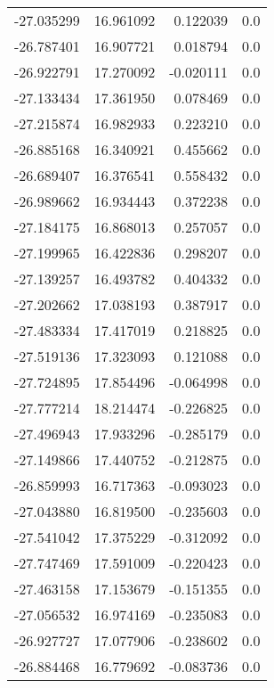 \begin{tabular}{rrrr}
      -27.035299 &        16.961092 &    0.122039 &   0.0 \\
      -26.787401 &        16.907721 &    0.018794 &   0.0 \\
      -26.922791 &        17.270092 &   -0.020111 &   0.0 \\
      -27.133434 &        17.361950 &    0.078469 &   0.0 \\
      -27.215874 &        16.982933 &    0.223210 &   0.0 \\
      -26.885168 &        16.340921 &    0.455662 &   0.0 \\
      -26.689407 &        16.376541 &    0.558432 &   0.0 \\
      -26.989662 &        16.934443 &    0.372238 &   0.0 \\
      -27.184175 &        16.868013 &    0.257057 &   0.0 \\
      -27.199965 &        16.422836 &    0.298207 &   0.0 \\
      -27.139257 &        16.493782 &    0.404332 &   0.0 \\
      -27.202662 &        17.038193 &    0.387917 &   0.0 \\
      -27.483334 &        17.417019 &    0.218825 &   0.0 \\
      -27.519136 &        17.323093 &    0.121088 &   0.0 \\
      -27.724895 &        17.854496 &   -0.064998 &   0.0 \\
      -27.777214 &        18.214474 &   -0.226825 &   0.0 \\
      -27.496943 &        17.933296 &   -0.285179 &   0.0 \\
      -27.149866 &        17.440752 &   -0.212875 &   0.0 \\
      -26.859993 &        16.717363 &   -0.093023 &   0.0 \\
      -27.043880 &        16.819500 &   -0.235603 &   0.0 \\
      -27.541042 &        17.375229 &   -0.312092 &   0.0 \\
      -27.747469 &        17.591009 &   -0.220423 &   0.0 \\
      -27.463158 &        17.153679 &   -0.151355 &   0.0 \\
      -27.056532 &        16.974169 &   -0.235083 &   0.0 \\
      -26.927727 &        17.077906 &   -0.238602 &   0.0 \\
      -26.884468 &        16.779692 &   -0.083736 &   0.0 \\

\end{tabular}
